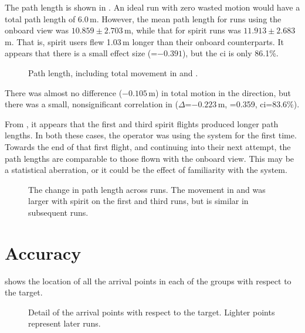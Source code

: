   The path length is shown in .
  An ideal run with zero wasted motion would have a total path length of 6.0\,m.
  However, the mean path length for runs using the onboard view was $10.859 \pm 2.703$\,m, while that for \gls{spirit} runs was $11.913 \pm 2.683$\,m.
  That is, \gls{spirit} users flew 1.03\,m longer than their onboard counterparts.
  It appears that there is a small effect size (=$-0.391$), but the \gls{ci} is only 86.1\%.


  \begin{figure}[h]
    \centering
    
    \caption[Path lengths]{Path length, including total movement in  and .}
    \label{fig:movement}
  \end{figure}

  There was almost no difference ($-0.105$\,m) in total motion in the  direction, but there was a small, nonsignificant correlation in  ($\Delta$=$-0.223$\,m, =0.359, \gls{ci}=83.6\%).

  From , it appears that the first and third \gls{spirit} flights produced longer path lengths.
  In both these cases, the operator was using the system for the first time.
  Towards the end of that first flight, and continuing into their next attempt, the path lengths are comparable to those flown with the onboard view.
  This may be a statistical aberration, or it could be the effect of familiarity with the system.

  \begin{figure}[h]
    \centering
    
    \caption[Path lengths across runs]{The change in path length across runs. The movement in  and  was larger with \gls{spirit} on the first and third runs, but is similar in subsequent runs.}
    \label{fig:movement_runs}
  \end{figure}

  \section{Accuracy}
   shows the location of all the arrival points in each of the groups with respect to the target.

  \begin{figure}[h]
    \centering
    
    \caption[Arrival overview]{Detail of the arrival points with respect to the target. Lighter points represent later runs.}
    \label{fig:paths_detailed}
  \end{figure}

